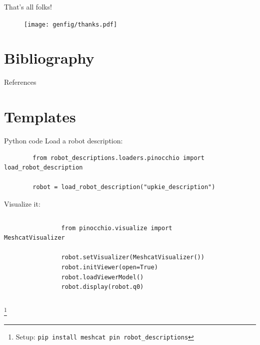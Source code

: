 \documentclass[9pt, aspectratio=169]{beamer}
\newcommand\blfootnote[1]{%
  \begingroup
  \renewcommand\thefootnote{}%
  \footnote{#1}%
  \addtocounter{footnote}{-1}%
  \endgroup
}
\begin{document}
\begin{frame}{That's all folks!}
    \vspace{2em}
    \begin{figure}
        \centering
        \texttt{[image: genfig/thanks.pdf]}
    \end{figure}
\end{frame}


\section*{Bibliography}

\renewcommand*{\bibfont}{\footnotesize}
\begin{frame}[allowframebreaks]{References}
    \printbibliography[heading=none]
\end{frame}

\section*{Templates}

\begin{frame}[fragile]{Python code}
    Load a robot description:
    \begin{verbatim}
        from robot_descriptions.loaders.pinocchio import load_robot_description

        robot = load_robot_description("upkie_description")
    \end{verbatim}
    Visualize it:
    \begin{columns}
        \begin{column}{0.75\columnwidth}
            \begin{verbatim}
                from pinocchio.visualize import MeshcatVisualizer

                robot.setVisualizer(MeshcatVisualizer())
                robot.initViewer(open=True)
                robot.loadViewerModel()
                robot.display(robot.q0)
            \end{verbatim}
        \end{column}
        \begin{column}{0.24\columnwidth}
            \begin{figure}
                \centering
            \end{figure}
        \end{column}
    \end{columns}
    \blfootnote{
        Setup: \texttt{pip install meshcat pin robot_descriptions}
    }
\end{frame}
\end{document}

